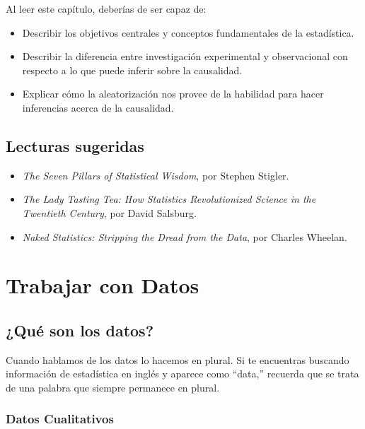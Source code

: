 \documentclass[
  12pt,
]{book}
\providecommand{\tightlist}{%
  \setlength{\itemsep}{0pt}\setlength{\parskip}{0pt}}
\begin{document}
Al leer este capítulo, deberías de ser capaz de:

\begin{itemize}
\tightlist
\item
  Describir los objetivos centrales y conceptos fundamentales de la estadística.
\item
  Describir la diferencia entre investigación experimental y observacional con respecto a lo que puede inferir sobre la causalidad.
\item
  Explicar cómo la aleatorización nos provee de la habilidad para hacer inferencias acerca de la causalidad.
\end{itemize}

\hypertarget{lecturas-sugeridas}{%
\section{Lecturas sugeridas}\label{lecturas-sugeridas}}

\begin{itemize}
\tightlist
\item
  \emph{The Seven Pillars of Statistical Wisdom}, por Stephen Stigler.
\item
  \emph{The Lady Tasting Tea: How Statistics Revolutionized Science in the Twentieth Century}, por David Salsburg.
\item
  \emph{Naked Statistics: Stripping the Dread from the Data}, por Charles Wheelan.
\end{itemize}

\hypertarget{trabajar-con-datos}{%
\chapter{Trabajar con Datos}\label{trabajar-con-datos}}

\hypertarget{quuxe9-son-los-datos}{%
\section{¿Qué son los datos?}\label{quuxe9-son-los-datos}}

Cuando hablamos de los datos lo hacemos en plural. Si te encuentras buscando información de estadística en inglés y aparece como ``data,'' recuerda que se trata de una palabra que siempre permanece en plural.

\hypertarget{datos-cualitativos}{%
\subsection{Datos Cualitativos}\label{datos-cualitativos}}
\end{document}
